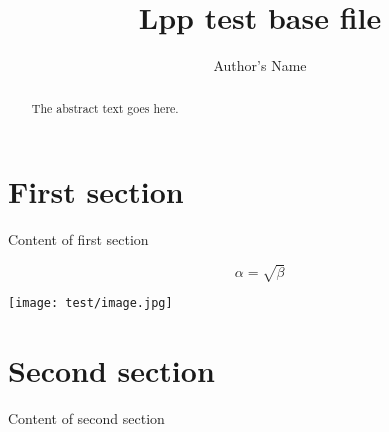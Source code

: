 \documentclass{article}
\begin{document}
\title{Lpp test base file}
\author{Author's Name}

\maketitle

\begin{abstract}
The abstract text goes here.
\end{abstract}


\section{First section}
Content of first section

\begin{equation}
    \label{simple_equation}
    \alpha = \sqrt{ \beta }
\end{equation}

\texttt{[image: test/image.jpg]}

\section{Second section}
Content of second section
\end{document}
